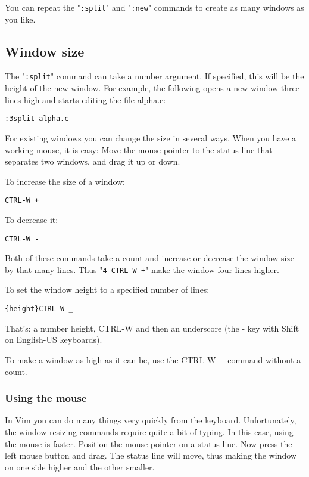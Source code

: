 You can repeat the "\verb!:split!" and "\verb!:new!" commands to create as many windows as you like.

\subsection{Window size}
The "\verb!:split!" command can take a number argument.
If specified, this will be the height of the new window.
For example, the following opens a new window three lines high and starts editing the file alpha.c:

 \begin{Verbatim}[samepage=true]
 :3split alpha.c
 \end{Verbatim}

For existing windows you can change the size in several ways.
When you have a working mouse, it is easy: Move the mouse pointer to the status line that separates two windows, and drag it up or down.

To increase the size of a window:

 \begin{Verbatim}[samepage=true]
 CTRL-W +
 \end{Verbatim}

To decrease it:

 \begin{Verbatim}[samepage=true]
 CTRL-W -
 \end{Verbatim}

Both of these commands take a count and increase or decrease the window size by that many lines.
Thus "\verb!4 CTRL-W +!" make the window four lines higher.

To set the window height to a specified number of lines:

 \begin{Verbatim}[samepage=true]
 {height}CTRL-W _
 \end{Verbatim}

That's: a number {height}, CTRL-W and then an underscore (the - key with Shift on English-US keyboards).

To make a window as high as it can be, use the CTRL-W \_ command without a count.

\subsubsection{Using the mouse}
In Vim you can do many things very quickly from the keyboard.
Unfortunately, the window resizing commands require quite a bit of typing.
In this case, using the mouse is faster.
Position the mouse pointer on a status line.
Now press the left mouse button and drag.
The status line will move, thus making the window on one side higher and the other smaller.

